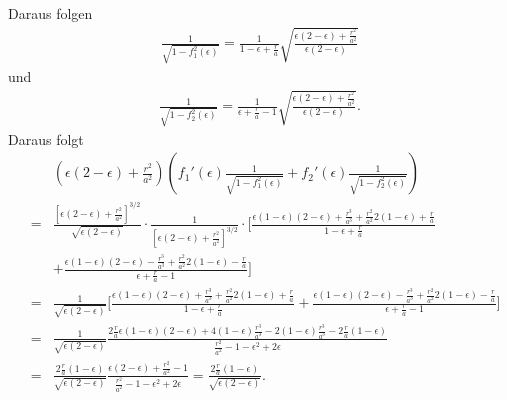 \documentclass{book}
\begin{document}
%
Daraus folgen
%
\begin{eqnarray}
\frac{1}{\sqrt{1 - f_1^2\left(\epsilon\right)}} = \frac{1}{1 - \epsilon + \frac{r}{a}}\sqrt{\frac{\epsilon\left(2 - \epsilon\right) + \frac{r^2}{a^2}}{\epsilon\left(2 - \epsilon\right)}}
\end{eqnarray}
%
und
%
\begin{eqnarray}
\frac{1}{\sqrt{1 - f_2^2\left(\epsilon\right)}} = \frac{1}{\epsilon + \frac{r}{a} - 1}\sqrt{\frac{\epsilon\left(2 - \epsilon\right) + \frac{r^2}{a^2}}{\epsilon\left(2 - \epsilon\right)}}.
\end{eqnarray}
%
Daraus folgt
%
\begin{eqnarray}
&&\left(\epsilon\left(2 - \epsilon\right) + \frac{r^2}{a^2}\right)\left(f_1'\left(\epsilon\right)\frac{1}{\sqrt{1 - f_1^2\left(\epsilon\right)}} + f_2'\left(\epsilon\right)\frac{1}{\sqrt{1 - f_2^2\left(\epsilon\right)}}\right)\nonumber\\
& = & \frac{\left[\epsilon\left(2 - \epsilon\right) + \frac{r^2}{a^2}\right]^{3/2}}{\sqrt{\epsilon\left(2 - \epsilon\right)}}\cdot\frac{1}{\left[\epsilon\left(2 - \epsilon\right) + \frac{r^2}{a^2}\right]^{3/2}}\cdot\bigg[\frac{\epsilon\left(1 - \epsilon\right)\left(2 - \epsilon\right) + \frac{r^3}{a^3} + \frac{r^2}{a^2}2\left(1 - \epsilon\right) + \frac{r}{a}}{1 - \epsilon + \frac{r}{a}}\nonumber\\
&&+ \frac{\epsilon\left(1 - \epsilon\right)\left(2 - \epsilon\right) - \frac{r^3}{a^3} + \frac{r^2}{a^2}2\left(1 - \epsilon\right) - \frac{r}{a}}{\epsilon + \frac{r}{a} - 1}\bigg]\nonumber\\
& = & \frac{1}{\sqrt{\epsilon\left(2 - \epsilon\right)}}\bigg[\frac{\epsilon\left(1 - \epsilon\right)\left(2 - \epsilon\right) + \frac{r^3}{a^3} + \frac{r^2}{a^2}2\left(1 - \epsilon\right) + \frac{r}{a}}{1 - \epsilon + \frac{r}{a}} + \frac{\epsilon\left(1 - \epsilon\right)\left(2 - \epsilon\right) - \frac{r^3}{a^3} + \frac{r^2}{a^2}2\left(1 - \epsilon\right) - \frac{r}{a}}{\epsilon + \frac{r}{a} - 1}\bigg]\nonumber\\
& = & \frac{1}{\sqrt{\epsilon\left(2 - \epsilon\right)}}\frac{2\frac{r}{a}\epsilon\left(1 - \epsilon\right)\left(2 - \epsilon\right) + 4\left(1 - \epsilon\right)\frac{r^3}{a^3} - 2\left(1 - \epsilon\right)\frac{r^3}{a^3} - 2\frac{r}{a}\left(1 - \epsilon\right)}{\frac{r^2}{a^2} - 1 - \epsilon^2 + 2\epsilon}\nonumber\\
& = & \frac{2\frac{r}{a}\left(1 - \epsilon\right)}{\sqrt{\epsilon\left(2 - \epsilon\right)}}\frac{\epsilon\left(2 - \epsilon\right) + \frac{r^2}{a^2} - 1}{\frac{r^2}{a^2} - 1 - \epsilon^2 + 2\epsilon} = \frac{2\frac{r}{a}\left(1 - \epsilon\right)}{\sqrt{\epsilon\left(2 - \epsilon\right)}}.
\end{eqnarray}
\end{document}
